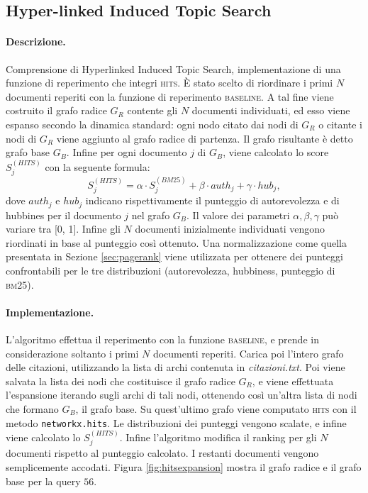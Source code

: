 \subsection{Hyper-linked Induced Topic Search}
\label{sec:hits}

\paragraph{\textbf{Descrizione.}}
Comprensione di Hyperlinked Induced Topic Search, implementazione di una funzione di reperimento che integri \textsc{hits}. \`E stato scelto di riordinare i primi $N$ documenti reperiti con la funzione di reperimento \textsc{baseline}. A tal fine viene costruito il grafo radice $G_R$ contente gli $N$ documenti individuati, ed esso viene espanso secondo la dinamica standard: ogni nodo citato dai nodi di $G_R$ o citante i nodi di $G_R$ viene aggiunto al grafo radice di partenza. Il grafo risultante \`e detto grafo base $G_B$. Infine per ogni documento $j$ di $G_B$, viene calcolato lo score $S^{(HITS)}_{j}$ con la seguente formula:
\[ S^{(HITS)}_j =  \alpha \cdot S^{(BM25)}_j + \beta \cdot auth_j + \gamma \cdot hub_j,\]
dove $auth_j$ e $hub_j$ indicano rispettivamente il punteggio di autorevolezza e di hubbines per il documento $j$ nel grafo $G_B$. Il valore dei parametri $\alpha, \beta, \gamma$ pu\`o variare tra [0, 1]. Infine gli $N$ documenti inizialmente individuati vengono riordinati in base al punteggio cos\`i ottenuto. Una normalizzazione come quella presentata in Sezione \ref{sec:pagerank} viene utilizzata per ottenere dei punteggi confrontabili per le tre distribuzioni (autorevolezza, hubbiness, punteggio di \textsc{bm25}).
\paragraph{\textbf{Implementazione.}}
L'algoritmo effettua il reperimento con la funzione \textsc{baseline}, e prende in considerazione soltanto i primi $N$ documenti reperiti. Carica poi l'intero grafo delle citazioni, utilizzando la lista di archi contenuta in \textit{citazioni.txt}. Poi viene salvata la lista dei nodi che costituisce il grafo radice $G_R$, e viene effettuata l'espansione iterando sugli archi di tali nodi, ottenendo cos\`i un'altra lista di nodi che formano $G_B$, il grafo base. Su quest'ultimo grafo viene computato \textsc{hits} con il metodo \texttt{networkx.hits}. Le distribuzioni dei punteggi vengono scalate, e infine viene calcolato lo $S^{(HITS)}_j$. Infine l'algoritmo modifica il ranking per gli $N$ documenti rispetto al punteggio calcolato. I restanti documenti vengono semplicemente accodati. Figura \ref{fig:hitsexpansion} mostra il grafo radice e il grafo base per la query $56$.

